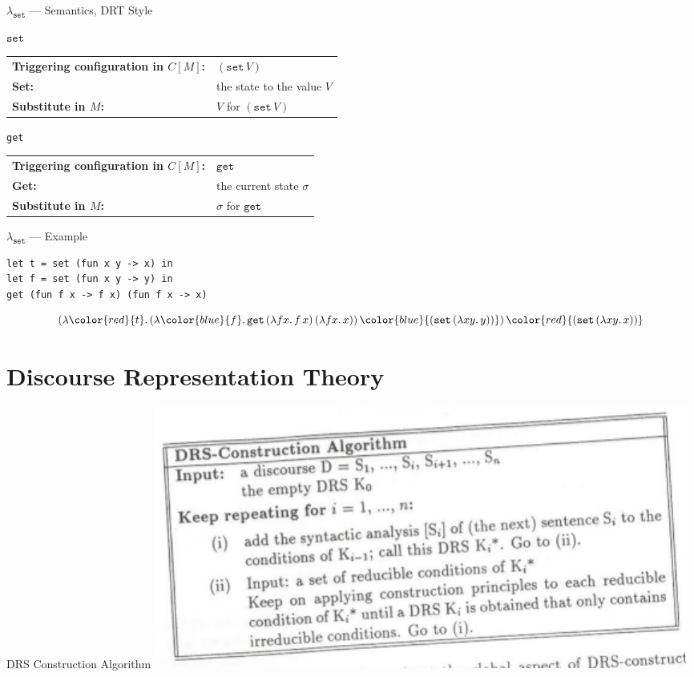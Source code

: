 \documentclass{beamer}
\newcommand{\lam}[2]{\lambda #1.\, #2}
\newcommand{\ap}[2]{#1\,#2}
\newcommand{\app}[3]{\ap{\ap{#1}{#2}}{#3}}
\newcommand{\set}{\texttt{set}}
\newcommand{\get}{\texttt{get}}
\begin{document}
\begin{frame}{$\lambda_\set$ --- Semantics, DRT Style}
  \begin{block}{$\set$}
   \vspace{4mm}
   \begin{tabular}{ll}
    \textbf{Triggering configuration in $C[M]$:} & $(\ap{\set}{V})$ \\
    \textbf{Set:} & the state to the value $V$ \\
    \textbf{Substitute in $M$:} & $V$ for $(\ap{\set}{V})$
  \end{tabular}
  \end{block}
  \pause
  \vspace{1cm}
  \begin{block}{\get}
   \vspace{4mm}
   \begin{tabular}{ll}
    \textbf{Triggering configuration in $C[M]$:} & $\get$ \\
    \textbf{Get:} & the current state $\sigma$ \\
    \textbf{Substitute in $M$:} & $\sigma$ for $\get$
  \end{tabular}
  \end{block}
\end{frame}

\begin{frame}[fragile]{$\lambda_\set$ --- Example}
  \begin{lstlisting}
let t = set (fun x y -> x) in
let f = set (fun x y -> y) in
get (fun f x -> f x) (fun f x -> x)
  \end{lstlisting}
  \vfill
  $$
  \ap{(\lam{{\color{red}{t}}}{\ap{(\lam{{\color{blue}{f}}}{\app{\get}{(\lam{f x}{\ap{f}{x}})}{(\lam{f x}{x})}})}{{\color{blue}{(\ap{\set}{(\lam{x y}{y})})}}}})}{{\color{red}{(\ap{\set}{(\lam{x y}{x})})}}}
  $$
\end{frame}


\section{Discourse Representation Theory}

\begin{frame}{DRS Construction Algorithm}
  \includegraphics[width=\textwidth]{cr-algo}
\end{frame}
\end{document}
